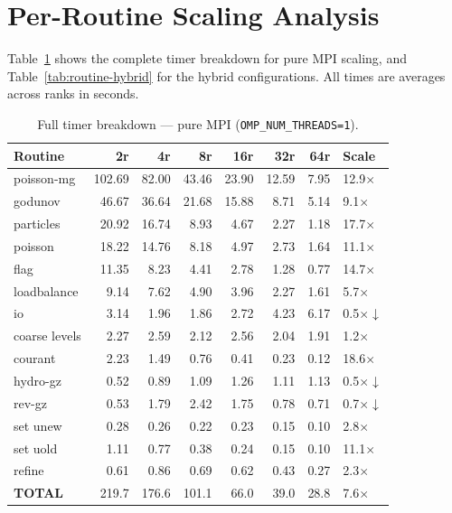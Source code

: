 \documentclass[11pt,fleqn]{book}
\begin{document}
\section{Per-Routine Scaling Analysis}

Table~\ref{tab:routine-mpi} shows the complete timer breakdown for pure MPI scaling, and Table~\ref{tab:routine-hybrid} for the hybrid configurations.  All times are averages across ranks in seconds.

\begin{table}[htbp]
\caption{Full timer breakdown --- pure MPI (\texttt{OMP\_NUM\_THREADS=1}).}
\label{tab:routine-mpi}
\begin{center}
\small
\begin{tabular}{lrrrrrrl}
\toprule
\textbf{Routine} & \textbf{2r} & \textbf{4r} & \textbf{8r} & \textbf{16r} & \textbf{32r} & \textbf{64r} & \textbf{Scale} \\
\midrule
poisson-mg     & 102.69 & 82.00 & 43.46 & 23.90 & 12.59 &  7.95 & 12.9$\times$ \\
godunov        &  46.67 & 36.64 & 21.68 & 15.88 &  8.71 &  5.14 &  9.1$\times$ \\
particles      &  20.92 & 16.74 &  8.93 &  4.67 &  2.27 &  1.18 & 17.7$\times$ \\
poisson        &  18.22 & 14.76 &  8.18 &  4.97 &  2.73 &  1.64 & 11.1$\times$ \\
flag           &  11.35 &  8.23 &  4.41 &  2.78 &  1.28 &  0.77 & 14.7$\times$ \\
loadbalance    &   9.14 &  7.62 &  4.90 &  3.96 &  2.27 &  1.61 &  5.7$\times$ \\
io             &   3.14 &  1.96 &  1.86 &  2.72 &  4.23 &  6.17 &  0.5$\times\downarrow$ \\
coarse levels  &   2.27 &  2.59 &  2.12 &  2.56 &  2.04 &  1.91 &  1.2$\times$ \\
courant        &   2.23 &  1.49 &  0.76 &  0.41 &  0.23 &  0.12 & 18.6$\times$ \\
hydro-gz       &   0.52 &  0.89 &  1.09 &  1.26 &  1.11 &  1.13 &  0.5$\times\downarrow$ \\
rev-gz         &   0.53 &  1.79 &  2.42 &  1.75 &  0.78 &  0.71 &  0.7$\times\downarrow$ \\
set unew       &   0.28 &  0.26 &  0.22 &  0.23 &  0.15 &  0.10 &  2.8$\times$ \\
set uold       &   1.11 &  0.77 &  0.38 &  0.24 &  0.15 &  0.10 & 11.1$\times$ \\
refine         &   0.61 &  0.86 &  0.69 &  0.62 &  0.43 &  0.27 &  2.3$\times$ \\
\midrule
\textbf{TOTAL} & 219.7  & 176.6 & 101.1 &  66.0 &  39.0 &  28.8 &  7.6$\times$ \\
\bottomrule
\end{tabular}
\end{center}
\end{table}
\end{document}
